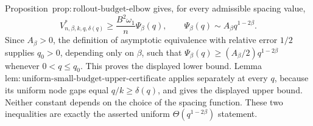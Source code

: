 Proposition~\(\mathrm{prop{:}rollout\text{-}budget\text{-}elbow}\) gives, for every admissible spacing value,
\[
V^*_{n,\beta,k,q,\delta(q)}
\ge\frac{B^2\omega_1}{n}\Psi_\beta(q),
\qquad
\Psi_\beta(q)\sim A_\beta q^{1-2\beta}.
\]
Since \(A_\beta>0\), the definition of asymptotic equivalence with relative error \(1/2\) supplies \(q_0>0\), depending only on \(\beta\), such that \(\Psi_\beta(q)\ge(A_\beta/2)q^{1-2\beta}\) whenever \(0<q\le q_0\).  This proves the displayed lower bound.  Lemma~\(\mathrm{lem{:}uniform\text{-}small\text{-}budget\text{-}upper\text{-}certificate}\) applies separately at every \(q\), because its uniform node gaps equal \(q/k\ge\delta(q)\), and gives the displayed upper bound.  Neither constant depends on the choice of the spacing function.  These two inequalities are exactly the asserted uniform \(\Theta(q^{1-2\beta})\) statement.